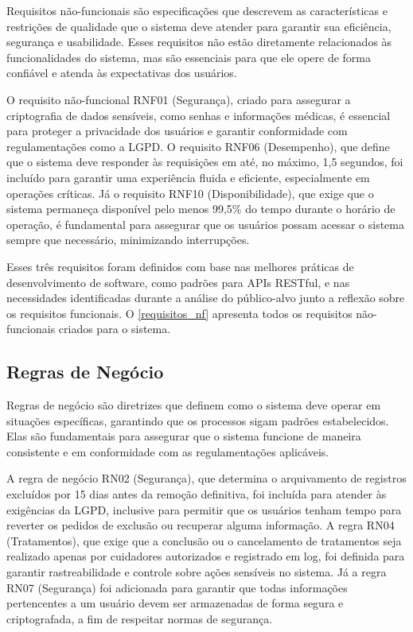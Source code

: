 \documentclass[
	article,			%
	12pt,				%
	oneside,			%
	a4paper,			%
    BIBLATEX,           %
	english,			%
	brazil,				%
	sumario=tradicional
	]{abntex2}
\begin{document}
Requisitos não-funcionais são especificações que descrevem as características e restrições de qualidade que o sistema deve atender para garantir sua eficiência, segurança e usabilidade. Esses requisitos não estão diretamente relacionados às funcionalidades do sistema, mas são essenciais para que ele opere de forma confiável e atenda às expectativas dos usuários.

O requisito não-funcional RNF01 (Segurança), criado para assegurar a criptografia de dados sensíveis, como senhas e informações médicas, é essencial para proteger a privacidade dos usuários e garantir conformidade com regulamentações como a LGPD. O requisito RNF06 (Desempenho), que define que o sistema deve responder às requisições em até, no máximo, 1,5 segundos, foi incluído para garantir uma experiência fluida e eficiente, especialmente em operações críticas. Já o requisito RNF10 (Disponibilidade), que exige que o sistema permaneça disponível pelo menos 99,5\% do tempo durante o horário de operação, é fundamental para assegurar que os usuários possam acessar o sistema sempre que necessário, minimizando interrupções.

Esses três requisitos foram definidos com base nas melhores práticas de desenvolvimento de software, como padrões para APIs RESTful, e nas necessidades identificadas durante a análise do público-alvo junto a reflexão sobre os requisitos funcionais. O \autoref{requisitos_nf} apresenta todos os requisitos não-funcionais criados para o sistema.

\subsection{Regras de Negócio}

Regras de negócio são diretrizes que definem como o sistema deve operar em situações específicas, garantindo que os processos sigam padrões estabelecidos. Elas são fundamentais para assegurar que o sistema funcione de maneira consistente e em conformidade com as regulamentações aplicáveis.

A regra de negócio RN02 (Segurança), que determina o arquivamento de registros excluídos por 15 dias antes da remoção definitiva, foi incluída para atender às exigências da LGPD, inclusive para permitir que os usuários tenham tempo para reverter os pedidos de exclusão ou recuperar alguma informação. A regra RN04 (Tratamentos), que exige que a conclusão ou o cancelamento de tratamentos seja realizado apenas por cuidadores autorizados e registrado em log, foi definida para garantir rastreabilidade e controle sobre ações sensíveis no sistema. Já a regra RN07 (Segurança) foi adicionada para garantir que todas informações pertencentes a um usuário devem ser armazenadas de forma segura e criptografada, a fim de respeitar normas de segurança.
\end{document}
